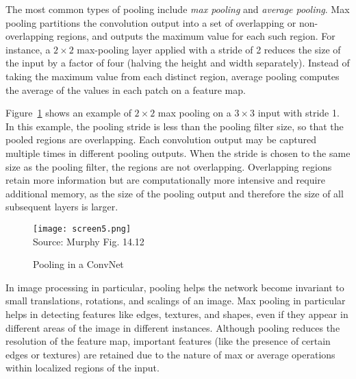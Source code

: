 The most common types of pooling include \emph{max pooling} and \emph{average pooling}. Max pooling partitions the convolution output into a set of overlapping or non-overlapping regions, and outputs the maximum value for each such region. For instance, a $2 \times 2$ max-pooling layer applied with a stride of 2 reduces the size of the input by a factor of four (halving the height and width separately). Instead of taking the maximum value from each distinct region, average pooling computes the average of the values in each patch on a feature map. 

Figure~\ref{fig:screen5_chap16} shows an example of $2 \times 2$ max pooling on a $3 \times 3$ input with stride 1. In this example, the pooling stride is less than the pooling filter size, so that the pooled regions are overlapping. Each convolution output may be captured multiple times in different pooling outputs. When the stride is chosen to the same size as the pooling filter, the regions are not overlapping. Overlapping regions retain more information but are computationally more intensive and require additional memory, as the size of the pooling output and therefore the size of all subsequent layers is larger. 

\begin{figure}
\centering
\texttt{[image: screen5.png]} \\

\scriptsize Source: Murphy Fig. 14.12
\caption{Pooling in a ConvNet}
\label{fig:screen5_chap16}
\end{figure}

In image processing in particular, pooling helps the network become invariant to small translations, rotations, and scalings of an image. Max pooling in particular helps in detecting features like edges, textures, and shapes, even if they appear in different areas of the image in different instances. Although pooling reduces the resolution of the feature map, important features (like the presence of certain edges or textures) are retained due to the nature of max or average operations within localized regions of the input.

